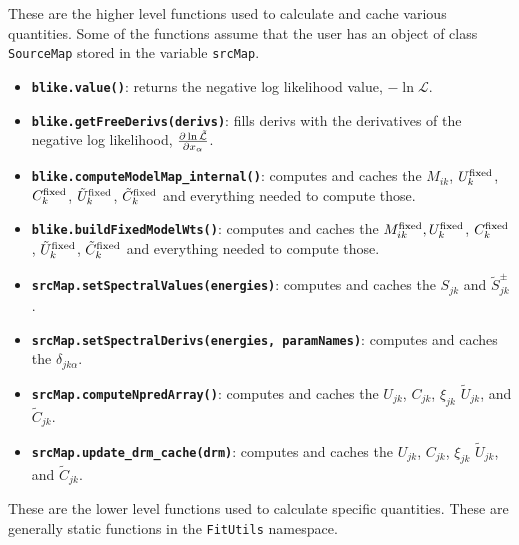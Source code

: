 \documentclass[preprint]{aastex}
\begin{document}
These are the higher level functions used to calculate and cache various quantities.
Some of the functions assume that the user has an object of class {\tt
  SourceMap} stored in the variable {\tt srcMap}.

\begin{itemize}
\item{ {\bf {\tt blike.value()}}: returns the negative log
    likelihood value, $-\ln \mathcal{L}$.}
\item{ {\bf {\tt blike.getFreeDerivs(derivs)}}: fills derivs
    with the derivatives of the negative log likelihood,
    $\frac{\partial \-\ln \tilde{\mathcal{L}}}{\partial x_{\alpha}}$.}
\item{ {\bf {\tt blike.computeModelMap\_internal()}}: computes
    and caches the $M_{ik}$, $U_{k}^{\rm fixed}$, $C_{k}^{\rm fixed}$, $\tilde{U}_{k}^{\rm fixed}$, $\tilde{C}_{k}^{\rm fixed}$ 
    and everything needed to compute those.}
\item{ {\bf {\tt blike.buildFixedModelWts()}}: computes and
    caches the $M_{ik}^{\rm fixed}, U_{k}^{\rm fixed}$, $C_{k}^{\rm fixed}$, $\tilde{U}_{k}^{\rm fixed}$, $\tilde{C}_{k}^{\rm fixed}$ and everything needed to compute those.}
\item{ {\bf {\tt srcMap.setSpectralValues(energies)}}: computes and
    caches the $S_{jk}$ and $\tilde{S}_{jk}^{\pm}$.}
\item{ {\bf {\tt srcMap.setSpectralDerivs(energies, paramNames)}}:
    computes and caches the $\delta_{jk\alpha}$.}
\item{ {\bf {\tt srcMap.computeNpredArray()}}: computes and caches the
    $U_{jk}$, $C_{jk}$, $\xi_{jk}$ $\tilde{U}_{jk}$, and $\tilde{C}_{jk}$.}
\item{ {\bf {\tt srcMap.update\_drm\_cache(drm)}}: computes and caches
    the $U_{jk}$, $C_{jk}$, $\xi_{jk}$ $\tilde{U}_{jk}$, and $\tilde{C}_{jk}$.}
\end{itemize}

These are the lower level functions used to calculate specific quantities.  These
are generally static functions in the {\tt FitUtils} namespace.
\end{document}
